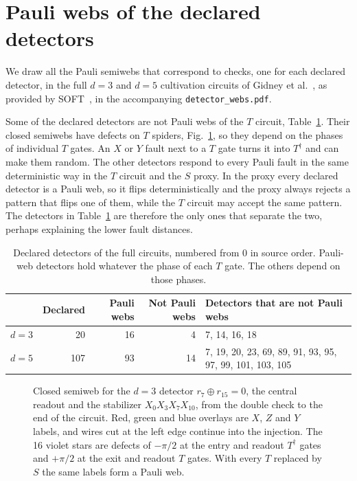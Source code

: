 \section{Pauli webs of the declared detectors}
\label{app:detector-webs}
We draw all the Pauli semiwebs that correspond to checks, one for each declared detector, in
the full $d=3$ and $d=5$ cultivation circuits of Gidney et al.~\cite{msc}, as provided by
SOFT~\cite{soft}, in the accompanying \texttt{detector\_webs.pdf}.

Some of the declared detectors are not Pauli webs of the $T$ circuit,
Table~\ref{tab:detector-webs}. Their closed semiwebs have defects on $T$ spiders,
Fig.~\ref{fig:detector-web}, so they depend on the phases of individual $T$ gates. An $X$ or $Y$
fault next to a $T$ gate turns it into $T^\dagger$ and can make them random. The other
detectors respond to every Pauli fault in the same deterministic way in the $T$ circuit and the
$S$ proxy. In the proxy every declared detector is a Pauli web, so it flips deterministically
and the proxy always rejects a pattern that flips one of them, while the $T$ circuit may accept
the same pattern. The detectors in Table~\ref{tab:detector-webs} are therefore the only ones that
separate the two, perhaps explaining the lower fault distances.

\begin{table}[h]
\centering
\caption{Declared detectors of the full circuits, numbered from 0 in source order.
Pauli-web detectors hold whatever the phase of each $T$ gate. The others depend on those
phases.}
\label{tab:detector-webs}
\begin{tabular}{lrrrl}
\toprule
 & Declared & Pauli webs & Not Pauli webs & Detectors that are not Pauli webs\\
\midrule
$d=3$ & 20 & 16 & 4 & 7, 14, 16, 18\\
$d=5$ & 107 & 93 & 14 & 7, 19, 20, 23, 69, 89, 91, 93, 95, 97, 99, 101, 103, 105\\
\bottomrule
\end{tabular}
\end{table}

\begin{figure}[h]
\centering
{}
\caption{Closed semiweb for the $d=3$ detector $r_7\oplus r_{15}=0$, the central
readout and the stabilizer $X_0X_3X_7X_{10}$, from the double check to the end of the circuit.
Red, green and blue overlays are $X$, $Z$ and $Y$ labels, and wires cut at the left edge
continue into the injection. The 16 violet stars are defects of $-\pi/2$ at the entry and
readout $T^\dagger$ gates and $+\pi/2$ at the exit and readout $T$ gates. With every $T$
replaced by $S$ the same labels form a Pauli web.}
\label{fig:detector-web}
\end{figure}
